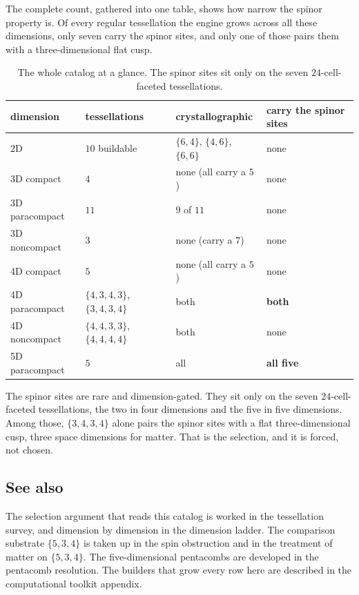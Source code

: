 The complete count, gathered into one table, shows how narrow the spinor property is. Of every regular tessellation the engine grows across all these dimensions, only seven carry the spinor sites, and only one of those pairs them with a three-dimensional flat cusp.

\begin{table}[ht]
\centering
\begin{tabular}{@{}llll@{}}
\toprule
dimension & tessellations & crystallographic & carry the spinor sites \\
\midrule
2D & $10$ buildable & $\{6,4\}$, $\{4,6\}$, $\{6,6\}$ & none \\
3D compact & $4$ & none (all carry a $5$) & none \\
3D paracompact & $11$ & $9$ of $11$ & none \\
3D noncompact & $3$ & none (carry a $7$) & none \\
4D compact & $5$ & none (all carry a $5$) & none \\
4D paracompact & $\{4,3,4,3\}$, $\{3,4,3,4\}$ & both & \textbf{both} \\
4D noncompact & $\{4,4,3,3\}$, $\{4,4,4,4\}$ & both & none \\
5D paracompact & $5$ & all & \textbf{all five} \\
\bottomrule
\end{tabular}
\caption{The whole catalog at a glance. The spinor sites sit only on the seven $24$-cell-faceted tessellations.}
\label{tab:catalog-glance}
\end{table}

\begin{principle}
The spinor sites are rare and dimension-gated. They sit only on the seven $24$-cell-faceted tessellations, the two in four dimensions and the five in five dimensions. Among those, $\{3,4,3,4\}$ alone pairs the spinor sites with a flat three-dimensional cusp, three space dimensions for matter. That is the selection, and it is forced, not chosen.
\end{principle}

\subsection{See also}

The selection argument that reads this catalog is worked in the tessellation survey, and dimension by dimension in the dimension ladder. The comparison substrate $\{5,3,4\}$ is taken up in the spin obstruction and in the treatment of matter on $\{5,3,4\}$. The five-dimensional pentacombs are developed in the pentacomb resolution. The builders that grow every row here are described in the computational toolkit appendix.
